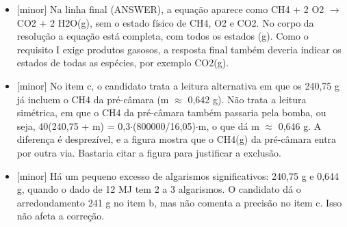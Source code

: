 \documentclass{article}%
\begin{document}
\begin{itemize}%
\item%
{[}minor{]} Na linha final (ANSWER), a equação aparece como CH4 + 2 O2 $\to$ CO2 + 2 H2O(g), sem o estado físico de CH4, O2 e CO2. No corpo da resolução a equação está completa, com todos os estados (g). Como o requisito I exige produtos gasosos, a resposta final também deveria indicar os estados de todas as espécies, por exemplo CO2(g).%
\item%
{[}minor{]} No item c, o candidato trata a leitura alternativa em que os 240,75 g já incluem o CH4 da pré{-}câmara (m $\approx$ 0,642 g). Não trata a leitura simétrica, em que o CH4 da pré{-}câmara também passaria pela bomba, ou seja, 40(240,75 + m) = 0,3$\cdot$(800000/16,05)$\cdot$m, o que dá m $\approx$ 0,646 g. A diferença é desprezível, e a figura mostra que o CH4(g) da pré{-}câmara entra por outra via. Bastaria citar a figura para justificar a exclusão.%
\item%
{[}minor{]} Há um pequeno excesso de algarismos significativos: 240,75 g e 0,644 g, quando o dado de 12 MJ tem 2 a 3 algarismos. O candidato dá o arredondamento 241 g no item b, mas não comenta a precisão no item c. Isso não afeta a correção.%
\end{itemize}%
\end{document}
